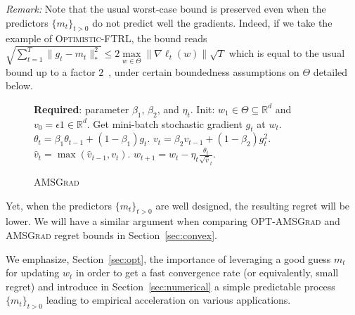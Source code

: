 \documentclass[wcp]{jmlr}
\begin{document}
\textit{Remark:} Note that the usual worst-case bound is preserved even when the predictors $\{m_{t}\}_{t>0}$ do not predict well the gradients. Indeed, if we take the example of \textsc{Optimistic-FTRL}, the bound reads $\sqrt{\sum_{t=1}^T \| g_t - m_t \|_*^2 } \leq 2 \max \limits_{w \in \Theta} \| \nabla \ell_t(w) \| \sqrt{T}$ which is equal to the usual bound up to a factor $2$~\citep{RS13b}, under certain boundedness assumptions on $\Theta$ detailed below.
\begin{figure}\vspace{-0.8cm}
\begin{minipage}{\linewidth}
\begin{algorithm}[H]
\caption{\textsc{AMSGrad} \citep{RKK18}} \label{alg:amsgrad}
\begin{algorithmic}[1]
\small
\STATE \textbf{Required}: parameter $\beta_1$, $\beta_2$, and $\eta_t$. 
\STATE Init: $w_{1} \in \Theta \subseteq \mathbb R^d $ and $v_{0} = \epsilon 1 \in \mathbb R^{d}$.
\STATE Get mini-batch stochastic gradient $g_t$ at $w_t$.
\STATE $\theta_t = \beta_1 \theta_{t-1} + (1 - \beta_1) g_t$.
\STATE $v_t = \beta_2 v_{t-1} + (1 - \beta_2) g_t^2$. 
\STATE \label{line:maxop}$\hat{v}_t = \max( \hat{v}_{t-1} , v_t )$. 
\STATE $w_{t+1} = w_t - \eta_t \frac{\theta_t}{ \sqrt{\hat{v}}_t }$.
\ENDFOR
\end{algorithmic}
\end{algorithm}
\vspace{-0.1in}
\end{minipage}\end{figure}
Yet, when the predictors $\{m_{t}\}_{t>0}$ are well designed, the resulting regret will be lower. 
We will have a similar argument when comparing \textsc{OPT-AMSGrad} and \textsc{AMSGrad} regret bounds in Section~\ref{sec:convex}.

We emphasize, Section~\ref{sec:opt}, the importance of leveraging a good guess $m_t$ for updating $w_t$ in order to get a fast convergence rate (or equivalently, small regret) and introduce in Section~\ref{sec:numerical} a simple predictable process $\{m_{t}\}_{t>0}$ leading to empirical acceleration on various applications.
\end{document}
